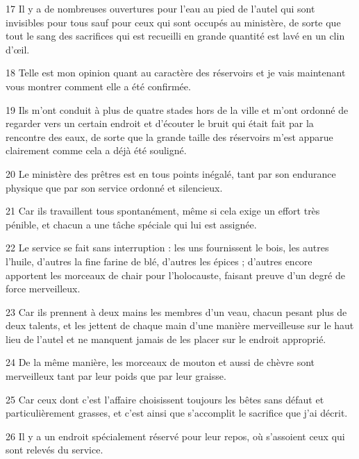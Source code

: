 \par 17 Il y a de nombreuses ouvertures pour l'eau au pied de l'autel qui sont invisibles pour tous sauf pour ceux qui sont occupés au ministère, de sorte que tout le sang des sacrifices qui est recueilli en grande quantité est lavé en un clin d'œil.

\par 18 Telle est mon opinion quant au caractère des réservoirs et je vais maintenant vous montrer comment elle a été confirmée.

\par 19 Ils m'ont conduit à plus de quatre stades hors de la ville et m'ont ordonné de regarder vers un certain endroit et d'écouter le bruit qui était fait par la rencontre des eaux, de sorte que la grande taille des réservoirs m'est apparue clairement comme cela a déjà été souligné.

\par 20 Le ministère des prêtres est en tous points inégalé, tant par son endurance physique que par son service ordonné et silencieux.

\par 21 Car ils travaillent tous spontanément, même si cela exige un effort très pénible, et chacun a une tâche spéciale qui lui est assignée.

\par 22 Le service se fait sans interruption : les uns fournissent le bois, les autres l'huile, d'autres la fine farine de blé, d'autres les épices ; d'autres encore apportent les morceaux de chair pour l'holocauste, faisant preuve d'un degré de force merveilleux.

\par 23 Car ils prennent à deux mains les membres d'un veau, chacun pesant plus de deux talents, et les jettent de chaque main d'une manière merveilleuse sur le haut lieu de l'autel et ne manquent jamais de les placer sur le endroit approprié.

\par 24 De la même manière, les morceaux de mouton et aussi de chèvre sont merveilleux tant par leur poids que par leur graisse.

\par 25 Car ceux dont c'est l'affaire choisissent toujours les bêtes sans défaut et particulièrement grasses, et c'est ainsi que s'accomplit le sacrifice que j'ai décrit.

\par 26 Il y a un endroit spécialement réservé pour leur repos, où s'assoient ceux qui sont relevés du service.

